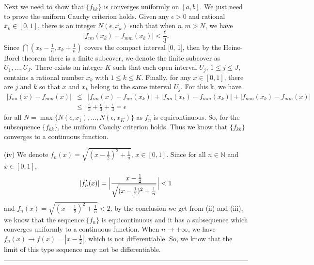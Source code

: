 \documentclass[12pt]{article}
\begin{document}
Next we need to show that $\{f_{kk}\}$ is converges uniformly on $[a, b]$. We just need to prove the uniform Cauchy criterion holds. Given any $\epsilon > 0$ and rational $x_{k} \in [0, 1]$, there is an integer $N(\epsilon, x_{k})$ such that when $n, m > N$, we have
\begin{equation*}
   |f_{nn}(x_{k}) - f_{mm}(x_{k})| < \frac{\epsilon}{3}.
\end{equation*}
Since $\bigcap (x_{k} - \frac{1}{n}, x_{k} + \frac{1}{n})$ covers the compact interval [0, 1], then by the Heine-Borel theorem there is a finite subcover, we denote the finite subcover as $U_{1}, \dots, U_{J}$. There exists an integer $K$ such that each open interval $U_{j}$, $1 \leq j \leq J$, contains a rational number $x_{k}$ with $1 \leq k \leq K$. Finally, for any $x \in [0, 1]$, there are $j$ and $k$ so that $x$ and $x_{k}$ belong to the same interval $U_{j}$. For this k, we have
\begin{eqnarray*}
|f_{nn}(x) - f_{mm}(x)| & \leq & |f_{nn}(x) - f_{nn}(x_{k})| + |f_{nn}(x_{k}) - f_{mm}(x_{k})| + |f_{mm}(x_{k}) - f_{mm}(x)| \\
& \leq & \frac{\epsilon}{3} + \frac{\epsilon}{3} + \frac{\epsilon}{3} = \epsilon
\end{eqnarray*}
for all $ N = \max\{N(\epsilon,x_{1}), \dots, N(\epsilon,x_{K})\}$ as $f_{n}$ is equicontinuous. So, for the subsequence $\{f_{kk}\}$, the uniform Cauchy criterion holds. Thus we know that $\{f_{kk}\}$ converges to a continuous function.



(iv) We denote $f_{n} (x) = \sqrt{(x - \frac{1}{2})^{2} + \frac{1}{n}}, \, x \in [0, 1]$. Since for all $n \in \mathbb{N}$ and $x \in [0, 1]$,
\begin{equation*}
   |f'_{n}(x)| = \Big{|} \frac{x - \frac{1}{2}}{\sqrt{(x - \frac{1}{2})^{2} + \frac{1}{n}}} \Big{|} < 1
\end{equation*}
and $f_{n} (x) = \sqrt{(x - \frac{1}{2})^{2} + \frac{1}{n}} < 2$, by the conclusion we get from (ii) and (iii), we know that the sequence $\{f_{n}\}$ is equicontinuous and it has a subsequence which converges uniformly to a continuous function. When $n \to + \infty$, we have $f_{n}(x) \to f(x) = |x - \frac{1}{2}|$, which is not differentiable. So, we know that the limit of this type sequence may not be differentiable.

\noindent\rule[0.25\baselineskip]{\textwidth}{0.5pt}

\vspace{8pt}
\end{document}
